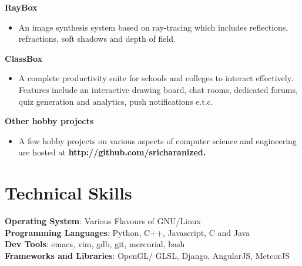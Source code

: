 \documentclass{res}
\begin{document}
\begin{resume}
  {\bf RayBox} 
        \begin{itemize}
        \item[] An image synthesis system based on ray-tracing which includes
					reflections, refractions, soft shadows and depth of field.
       \end{itemize}

   {\bf  ClassBox} 
        \begin{itemize}
        \item[]  A complete productivity suite for schools and colleges to interact
								effectively. Features include an interactive drawing board, chat rooms,
								dedicated forums, quiz generation and analytics, push notifications e.t.c.
       \end{itemize} 
		
		{\bf  Other hobby projects} 
        \begin{itemize}
        \item[]  A few hobby projects on various aspects of computer
								science and engineering are hosted at \bf{ http://github.com/sricharanized}.
       \end{itemize} 

\section{Technical Skills} 
\vspace{0.1in} 
    {\bf Operating System}: Various Flavours of GNU/Linux\\
    {\bf Programming Languages}: Python, C++, Javascript, C and Java \\
		{\bf Dev Tools}: emacs, vim, gdb, git, mercurial, bash \\
		{\bf Frameworks and Libraries}: OpenGL/ GLSL, Django, AngularJS, MeteorJS
 

\end{resume}
\end{document}
